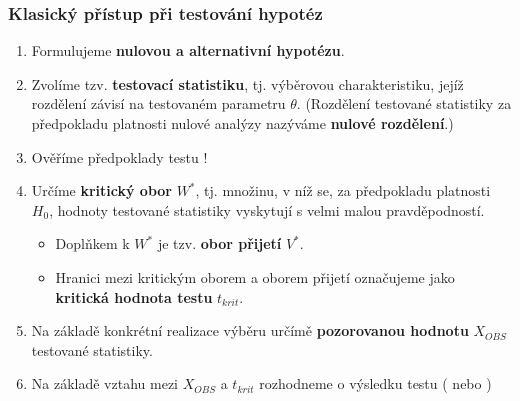 \subsubsection{Klasický přístup při testování hypotéz}
\begin{enumerate}
	\item Formulujeme \textbf{nulovou a alternativní hypotézu}.
	\item Zvolíme tzv. \textbf{testovací statistiku}, tj. výběrovou charakteristiku, jejíž rozdělení závisí na testovaném parametru $\theta$. (Rozdělení testované statistiky za předpokladu platnosti nulové analýzy nazýváme \textbf{nulové rozdělení}.)
	\item Ověříme předpoklady testu ! %
	\item Určíme \textbf{kritický obor} $W^*$, tj. množinu, v níž se, za předpokladu platnosti $H_0$, hodnoty testované statistiky vyskytují s velmi malou pravděpodností.
	\begin{itemize}
		\item Doplňkem k $W^*$ je tzv. \textbf{obor přijetí} $V^*$.
		\item Hranici mezi kritickým oborem a oborem přijetí označujeme jako \textbf{kritická hodnota testu} $t_{krit}$.
	\end{itemize}
	\item Na základě konkrétní realizace výběru určímě \textbf{pozorovanou hodnotu} $X_{OBS}$ testované statistiky. 
	\item Na základě vztahu mezi $X_{OBS}$ a $t_{krit}$ rozhodneme o výsledku testu ( nebo )
\end{enumerate}

